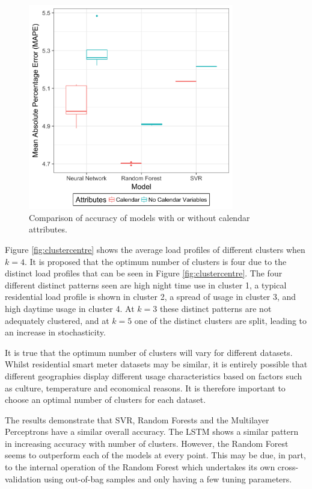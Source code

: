\begin{figure}
	\includegraphics[width=0.8\textwidth]{Chapter5/figures/calendar_attr.png}
	\caption{Comparison of accuracy of models with or without calendar attributes.}
	\label{fig:calendar_attr}
\end{figure}



Figure \ref{fig:clustercentre} shows the average load profiles of different clusters when $k=4$. It is proposed that the optimum number of clusters is four due to the distinct load profiles that can be seen in Figure \ref{fig:clustercentre}. The four different distinct patterns seen are high night time use in cluster 1, a typical residential load profile is shown in cluster 2, a spread of usage in cluster 3, and high daytime usage in cluster 4. At $k=3$ these distinct patterns are not adequately clustered, and at $k=5$ one of the distinct clusters are split, leading to an increase in stochasticity.

It is true that the optimum number of clusters will vary for different datasets. Whilst residential smart meter datasets may be similar, it is entirely possible that different geographies display different usage characteristics based on factors such as culture, temperature and economical reasons. It is therefore important to choose an optimal number of clusters for each dataset.

The results demonstrate that SVR, Random Forests and the Multilayer Perceptrons have a similar overall accuracy. The LSTM shows a similar pattern in increasing accuracy with number of clusters. However, the Random Forest seems to outperform each of the models at every point. This may be due, in part, to the internal operation of the Random Forest which undertakes its own cross-validation using out-of-bag samples and only having a few tuning parameters. 

